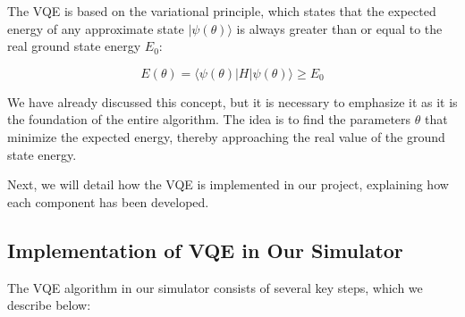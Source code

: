 The VQE is based on the variational principle, which states that the expected energy of any approximate state \( |\psi(\theta)\rangle \) is always greater than or equal to the real ground state energy \( E_0 \):

\[
E(\theta) = \langle \psi(\theta) | H | \psi(\theta) \rangle \geq E_0
\]

We have already discussed this concept, but it is necessary to emphasize it as it is the foundation of the entire algorithm. The idea is to find the parameters \( \theta \) that minimize the expected energy, thereby approaching the real value of the ground state energy.

\bigskip

Next, we will detail how the VQE is implemented in our project, explaining how each component has been developed.

\subsection{Implementation of VQE in Our Simulator}

The VQE algorithm in our simulator consists of several key steps, which we describe below:


